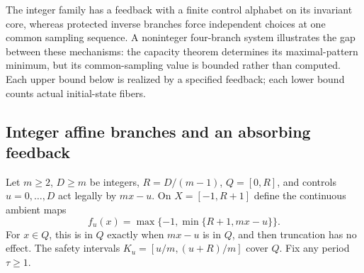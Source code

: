 \documentclass[11pt,reqno]{amsart}
\numberwithin{equation}{section}
\theoremstyle{definition}
\theoremstyle{definition}
\begin{document}
The integer family has a feedback with a finite control alphabet on its invariant core,
whereas protected inverse branches force independent choices at
one common sampling sequence. A noninteger four-branch system
illustrates the gap between these mechanisms: the capacity theorem
determines its maximal-pattern minimum, but its common-sampling
value is bounded rather than computed. Each upper bound below is
realized by a specified feedback; each lower bound counts actual
initial-state fibers.

\subsection{Integer affine branches and an absorbing feedback}
Let $m\ge2$, $D\ge m$ be integers, $R=D/(m-1)$,
$Q=[0,R]$, and controls $u=0,\ldots,D$ act legally by $mx-u$.
On $X=[-1,R+1]$ define the continuous ambient maps
\[
 f_u(x)=\max\{-1,\min\{R+1,mx-u\}\}.
\]
For $x\in Q$, this is in $Q$ exactly when $mx-u$ is in $Q$,
and then truncation has no effect. The safety intervals
$K_u=[u/m,(u+R)/m]$ cover $Q$. Fix any period $\tau\ge1$.
\end{document}
